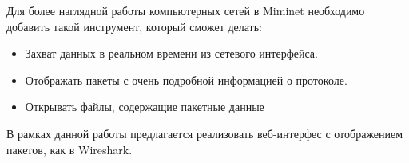 

Для более наглядной работы компьютерных сетей 
в Miminet необходимо добавить такой инструмент, 
который сможет делать: 
\begin{itemize}
	\item Захват данных в реальном времени из сетевого интерфейса. 
	\item Отображать пакеты с очень подробной информацией о протоколе.
	\item Открывать файлы, содержащие пакетные данные
\end{itemize}

В рамках данной работы предлагается реализовать 
веб-интерфес с отображением пакетов, как в Wireshark.

